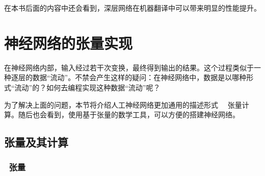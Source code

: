 \parinterval 在本书后面的内容中还会看到，深层网络在机器翻译中可以带来明显的性能提升。


\sectionnewpage
\section{神经网络的张量实现}

\parinterval 在神经网络内部，输入经过若干次变换，最终得到输出的结果。这个过程类似于一种逐层的数据``流动''。不禁会产生这样的疑问：在神经网络中，数据是以哪种形式``流动''的？如何去编程实现这种数据``流动''呢？

\parinterval 为了解决上面的问题，本节将介绍人工神经网络更加通用的描述形式 \ \dash \ 张量计算。随后也会看到，使用基于张量的数学工具，可以方便的搭建神经网络。



\subsection{ 张量及其计算}


\subsubsection{\ 张量}

